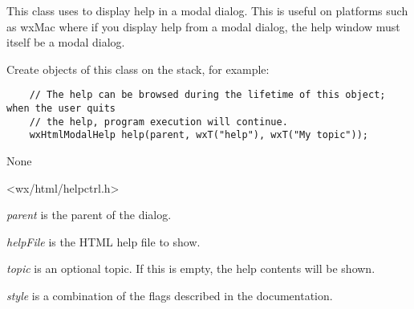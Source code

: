 This class uses  
to display help in a modal dialog. This is useful on platforms such as wxMac
where if you display help from a modal dialog, the help window must itself be a modal
dialog.

Create objects of this class on the stack, for example:

\begin{verbatim}
    // The help can be browsed during the lifetime of this object; when the user quits
    // the help, program execution will continue.
    wxHtmlModalHelp help(parent, wxT("help"), wxT("My topic"));
\end{verbatim}


None


<wx/html/helpctrl.h>


\label{wxhtmlmodalhelpctor}



{\it parent} is the parent of the dialog.

{\it helpFile} is the HTML help file to show.

{\it topic} is an optional topic. If this is empty, the help contents will be shown.

{\it style} is a combination of the flags described in the  documentation.


